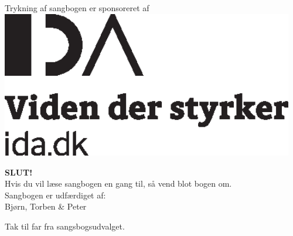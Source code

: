 \clearpage
{}
\pagecolor{myblue}

\pagestyle{empty}
\begin{center}

{\large\textcolor{sort}{Trykning af sangbogen er sponsoreret af \vspace{2cm}}} \\
\includegraphics[width=0.96\textwidth]{res/idablack.eps} \\

%
%

\vspace{7cm}

{\Huge \textbf{\textcolor{sort}{SLUT!}}}\\
{\large\textcolor{sort}{ Hvis du vil læse sangbogen en gang til, så vend blot bogen
  om.}}\\
\vspace{0.5cm}
\textcolor{sort}{Sangbogen er udfærdiget af:\\
  Bjørn, Torben \& Peter}

\vspace{0.5cm}
Tak til far fra sangsbogsudvalget.
\end{center}
